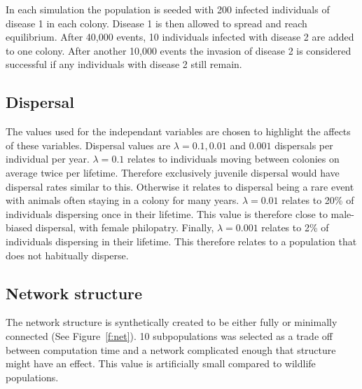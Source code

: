 In each simulation the population is seeded with 200 infected individuals of disease 1 in each colony. 
Disease 1 is then allowed to spread and reach equilibrium. 
After 40,000 events, 10 individuals infected with disease 2 are added to one colony. 
After another 10,000 events the invasion of disease 2 is considered successful if any individuals with disease 2 still remain.



\subsection{Dispersal}

The values used for the independant variables are chosen to highlight the affects of these variables. 
Dispersal values are $\lambda = 0.1, 0.01$ and $ 0.001$ dispersals per individual per year. 
$\lambda = 0.1$ relates to individuals moving between colonies on average twice per lifetime. 
Therefore exclusively juvenile dispersal would have dispersal rates similar to this. 
Otherwise it relates to dispersal being a rare event with animals often staying in a colony for many years.
$\lambda = 0.01$ relates to 20\% of individuals dispersing once in their lifetime.
This value is therefore close to male-biased dispersal, with female philopatry. 
Finally, $\lambda = 0.001$ relates to 2\% of individuals dispersing in their lifetime.
This therefore relates to a population that does not habitually disperse.




\subsection{Network structure}
The network structure is synthetically created to be either fully or minimally connected (See Figure~\ref{f:net}). 
10 subpopulations was selected as a trade off between computation time and a network complicated enough that structure might have an effect. 
This value is artificially small compared to wildlife populations. 

